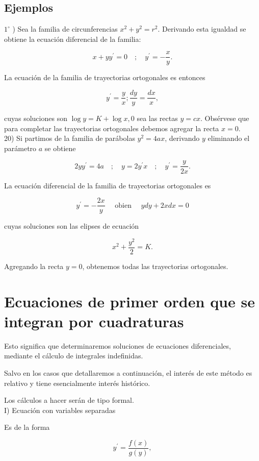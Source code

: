 \documentclass[10pt]{article}
\theoremstyle{plain}
\theoremstyle{definition}
\theoremstyle{remark}
\begin{document}
\subsection{Ejemplos}
$1^{\circ}$ ) Sea la familia de circunferencias $x^{2}+y^{2}=r^{2}$. Derivando esta igualdad se obtiene la ecuación diferencial de la familia:

$$
x+y y^{\prime}=0 \quad ; \quad y^{\prime}=-\frac{x}{y} .
$$

La ecuación de la familia de trayectorias ortogonales es entonces

$$
y^{\prime}=\frac{y}{x} ; \frac{d y}{y}=\frac{d x}{x},
$$

cuyas soluciones son $\log y=K+\log x, 0$ sea las rectas $y=c x$. Obsérvese que para completar las trayectorias ortogonales debemos agregar la recta $x=0$.\\
20) Si partimos de la familia de parábolas $y^{2}=4 a x$, derivando $y$ eliminando el parámetro $a$ se obtiene

$$
2 y y^{\prime}=4 a \quad ; \quad y=2 y^{\prime} x \quad ; \quad y^{\prime}=\frac{y}{2 x} .
$$

La ecuación diferencial de la familia de trayectorias ortogonales es

$$
y^{\prime}=-\frac{2 x}{y} \quad \text { obien } \quad y d y+2 x d x=0
$$

cuyas soluciones son las elipses de ecuación

$$
x^{2}+\frac{y^{2}}{2}=K .
$$

Agregando la recta $y=0$, obtenemos todas las trayectorias ortogonales.

\section{Ecuaciones de primer orden que se integran por cuadraturas}
Esto significa que determinaremos soluciones de ecuaciones diferenciales, mediante el cálculo de integrales indefinidas.

Salvo en los casos que detallaremos a continuación, el interés de este método es relativo y tiene esencialmente interés histórico.

Los cálculos a hacer serán de tipo formal.\\
I) Ecuación con variables separadas

Es de la forma


\begin{equation*}
y^{\prime}=\frac{f(x)}{g(y)}, \tag{4-1}
\end{equation*}
\end{document}
